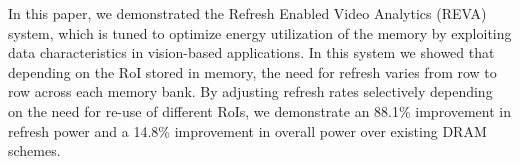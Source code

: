 In this paper, we demonstrated the Refresh Enabled Video Analytics (REVA) system, which is tuned to optimize energy utilization of the memory by exploiting data characteristics in vision-based applications. In this system we showed that depending on the RoI stored in memory, the need for refresh varies from row to row across each memory bank. By adjusting refresh rates selectively depending on the need for re-use of different RoIs, we demonstrate an 88.1\% improvement in refresh power and a 14.8\% improvement in overall power over existing DRAM schemes.
